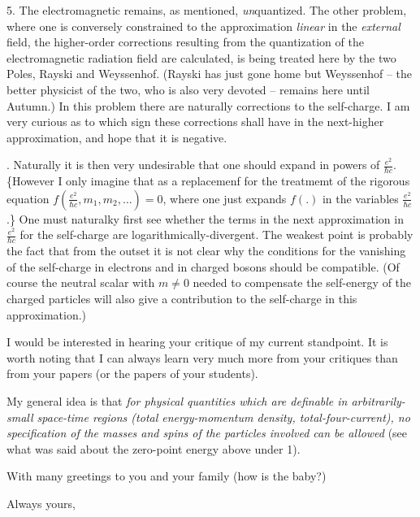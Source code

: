 \documentclass{article}
\begin{document}
5. The electromagnetic remains, as mentioned, \textit{un}quantized. The other problem, where one is conversely constrained to the approximation \textit{linear} in the \textit{external} field,
 the higher-order corrections resulting from the quantization of the electromagnetic radiation field are calculated, is being treated here by the two Poles, Rayski and Weyssenhof. (Rayski has just gone home but Weyssenhof -- the better physicist of the two, who is also very devoted -- remains here until Autumn.) In this problem there are naturally corrections to the self-charge. I am very curious as to which sign these corrections shall have in the next-higher approximation, and hope that it is negative.

. Naturally it is then very undesirable that one should expand in powers of $\frac {e^2}{\hbar c}$. \{However I only imagine that as a replacemenf for the treatmemt of the rigorous equation $f(\frac{e^2}{\hbar c}, m_1, m_2, \dots) = 0$, where one just expands $f(.)$ in the variables $\frac{e^2}{\hbar c}$.\} One must naturalky first see whether the terms in the next approximation in $\frac{e^2}{\hbar c}$ for the self-charge are logarithmically-divergent. The weakest point is probably the fact that from the outset it is not clear why the conditions for the vanishing of the self-charge in electrons and in charged bosons should be compatible. (Of course the neutral scalar  with $m \neq 0$ needed to compensate the self-energy of the charged particles will also give a contribution to the self-charge in this approximation.)

I would be interested in hearing your critique of my current standpoint. It is worth noting that I can always learn very much more from your critiques than from your papers (or the papers of your students).

My general idea is that \textit{for physical quantities which are definable in arbitrarily-small space-time regions (total energy-momentum density, total-four-current), no specification of the masses and spins of the particles involved can be allowed} (see what was said about the zero-point energy above under 1).

With many greetings to you and your family (how is the baby?)

Always yours,
\end{document}
